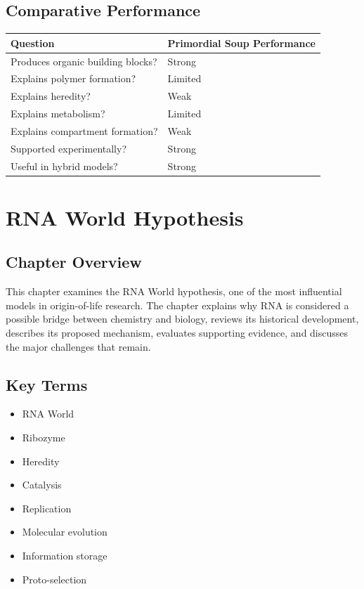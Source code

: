 \documentclass[
  oneside]{book}
\providecommand{\tightlist}{%
  \setlength{\itemsep}{0pt}\setlength{\parskip}{0pt}}
\begin{document}
\section{Comparative Performance}\label{comparative-performance}

\begin{longtable}[]{@{}ll@{}}
\toprule\noalign{}
Question & Primordial Soup Performance \\
\midrule\noalign{}
\endhead
\bottomrule\noalign{}
\endlastfoot
Produces organic building blocks? & Strong \\
Explains polymer formation? & Limited \\
Explains heredity? & Weak \\
Explains metabolism? & Limited \\
Explains compartment formation? & Weak \\
Supported experimentally? & Strong \\
Useful in hybrid models? & Strong \\
\end{longtable}

\chapter{RNA World Hypothesis}\label{rna-world-hypothesis}

\section{Chapter Overview}\label{chapter-overview-1}

This chapter examines the RNA World hypothesis, one of the most influential models in origin-of-life research. The chapter explains why RNA is considered a possible bridge between chemistry and biology, reviews its historical development, describes its proposed mechanism, evaluates supporting evidence, and discusses the major challenges that remain.

\section{Key Terms}\label{key-terms-1}

\begin{itemize}
\tightlist
\item
  RNA World
\item
  Ribozyme
\item
  Heredity
\item
  Catalysis
\item
  Replication
\item
  Molecular evolution
\item
  Information storage
\item
  Proto-selection
\end{itemize}
\end{document}
